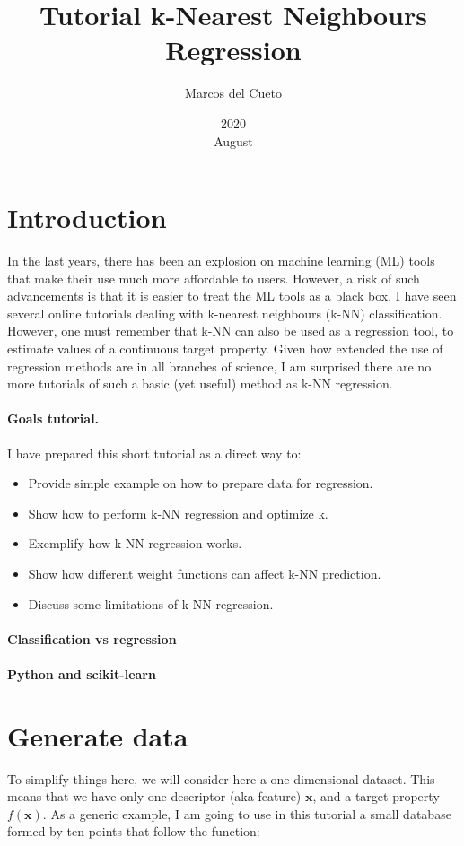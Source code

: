 \documentclass{article}%
\title{Tutorial k-Nearest Neighbours Regression}
\date{2020\\ August}
\author{Marcos del Cueto}
\begin{document}
\maketitle
\section{Introduction}

In the last years, there has been an explosion on machine learning (ML) tools that make their use much more affordable to users. However, a risk of such advancements is that it is easier to treat the ML tools as a black box. I have seen several online tutorials dealing with k-nearest neighbours (k-NN) classification. However, one must remember that k-NN can also be used as a regression tool, to estimate values of a continuous target property. Given how extended the use of regression methods are in all branches of science, I am surprised there are no more tutorials of such a basic (yet useful) method as k-NN regression.

\paragraph{Goals tutorial.} I have prepared this short tutorial as a direct way to:
\begin{itemize}
	\item Provide simple example on how to prepare data for regression.
	\item Show how to perform k-NN regression and optimize k.
	\item Exemplify how k-NN regression works.
	\item Show how different weight functions can affect k-NN prediction.
	\item Discuss some limitations of k-NN regression.
\end{itemize}

\paragraph{Classification vs regression}

\paragraph{Python and scikit-learn}

\section{Generate data}
To simplify things here, we will consider here a one-dimensional dataset. This means that we have only one descriptor (aka feature) $\mathbf{x}$, and a target property $f(\textbf{x})$. As a generic example, I am going to use in this tutorial a small database formed by ten points that follow the function:
\end{document}
